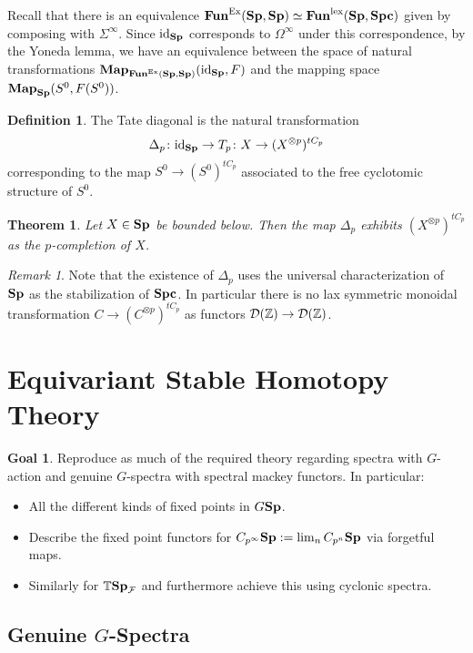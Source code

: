 \documentclass[letterpaper]{article}
\theoremstyle{definition}
\newtheorem{definition}{Definition}[section]
\newtheorem*{goal}{Goal}
\theoremstyle{remark}
\newtheorem{remark}{Remark}
\theoremstyle{plain}
\newtheorem{theorem}{Theorem}
\begin{document}
Recall that there is an equivalence $\mathbf{Fun}^{\textnormal{Ex}}(\mathbf{Sp},\mathbf{Sp})\simeq\mathbf{Fun}^{\textnormal{lex}}(\mathbf{Sp},\mathbf{Spc})$ given by composing with $\Sigma^\infty$. Since $\textnormal{id}_{\mathbf{Sp}}$ corresponds to $\Omega^\infty$ under this correspondence, by the Yoneda lemma, we have an equivalence between the space of natural transformations $\mathbf{Map}_{\mathbf{Fun}^{\textnormal{Ex}}(\mathbf{Sp},\mathbf{Sp})}(\textnormal{id}_{\mathbf{Sp}},F)$ and the mapping space $\mathbf{Map}_{\mathbf{Sp}}(S^0,F(S^0))$.

\begin{definition}
		The Tate diagonal is the natural transformation
		$$\Delta_p\colon\textnormal{id}_{\mathbf{Sp}}\rightarrow T_p\colon X\rightarrow(X^{\otimes p})^{tC_p}$$
		corresponding to the map $S^0\rightarrow(S^0)^{tC_p}$ associated to the free cyclotomic structure of $S^0$.
\end{definition}

\begin{theorem}
		Let $X\in\mathbf{Sp}$ be bounded below. Then the map $\Delta_p$ exhibits $(X^{\otimes p})^{tC_p}$ as the $p$-completion of $X$.
\end{theorem}

\begin{remark}
		Note that the existence of $\Delta_p$ uses the universal characterization of $\mathbf{Sp}$ as the stabilization of $\mathbf{Spc}$. In particular there is no lax symmetric monoidal transformation $C\rightarrow(C^{\otimes p})^{tC_p}$ as functors $\mathcal{D}(\mathbb{Z})\rightarrow\mathcal{D}(\mathbb{Z})$.
\end{remark}

\appendix

\section{Equivariant Stable Homotopy Theory}

\begin{goal}
		Reproduce as much of the required theory regarding spectra with $G$-action and genuine $G$-spectra with spectral mackey functors. In particular:
		\begin{itemize}
				\item All the different kinds of fixed points in $G\mathbf{Sp}$.
				\item Describe the fixed point functors for $C_{p^\infty}\mathbf{Sp}:=\lim_n C_{p^n}\mathbf{Sp}$ via forgetful maps.
				\item Similarly for $\mathbb{T}\mathbf{Sp}_{\mathcal{F}}$ and furthermore achieve this using cyclonic spectra.
		\end{itemize}
\end{goal}

\subsection{Genuine $G$-Spectra}
\end{document}
